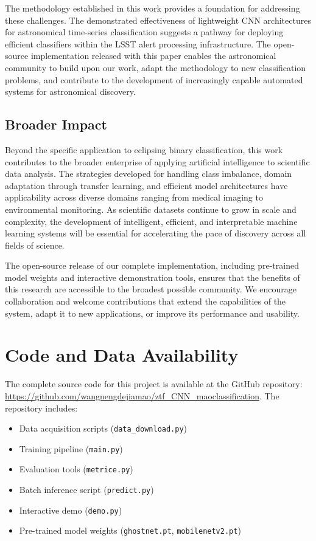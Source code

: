 \documentclass[11pt,a4paper]{article}
\newcommand{\code}[1]{\texttt{#1}}
\begin{document}
The methodology established in this work provides a foundation for addressing these challenges. The demonstrated effectiveness of lightweight CNN architectures for astronomical time-series classification suggests a pathway for deploying efficient classifiers within the LSST alert processing infrastructure. The open-source implementation released with this paper enables the astronomical community to build upon our work, adapt the methodology to new classification problems, and contribute to the development of increasingly capable automated systems for astronomical discovery.

\subsection{Broader Impact}

Beyond the specific application to eclipsing binary classification, this work contributes to the broader enterprise of applying artificial intelligence to scientific data analysis. The strategies developed for handling class imbalance, domain adaptation through transfer learning, and efficient model architectures have applicability across diverse domains ranging from medical imaging to environmental monitoring. As scientific datasets continue to grow in scale and complexity, the development of intelligent, efficient, and interpretable machine learning systems will be essential for accelerating the pace of discovery across all fields of science.

The open-source release of our complete implementation, including pre-trained model weights and interactive demonstration tools, ensures that the benefits of this research are accessible to the broadest possible community. We encourage collaboration and welcome contributions that extend the capabilities of the system, adapt it to new applications, or improve its performance and usability.

\section{Code and Data Availability}\label{sec:availability}

The complete source code for this project is available at the GitHub repository: \url{https://github.com/wangnengdejiamao/ztf_CNN_maoclassification}. The repository includes:

\begin{itemize}
    \item Data acquisition scripts (\code{data\_download.py})
    \item Training pipeline (\code{main.py})
    \item Evaluation tools (\code{metrice.py})
    \item Batch inference script (\code{predict.py})
    \item Interactive demo (\code{demo.py})
    \item Pre-trained model weights (\code{ghostnet.pt}, \code{mobilenetv2.pt})
\end{itemize}
\end{document}
